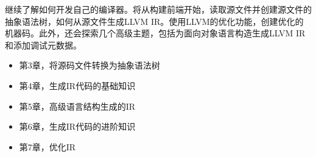 继续了解如何开发自己的编译器。将从构建前端开始，读取源文件并创建源文件的抽象语法树，如何从源文件生成LLVM IR。使用LLVM的优化功能，创建优化的机器码。此外，还会探索几个高级主题，包括为面向对象语言构造生成LLVM IR和添加调试元数据。

\begin{itemize}
\item
第3章，将源码文件转换为抽象语法树

\item
第4章，生成IR代码的基础知识

\item
第5章，高级语言结构生成的IR

\item
第6章，生成IR代码的进阶知识

\item
第7章，优化IR
\end{itemize}